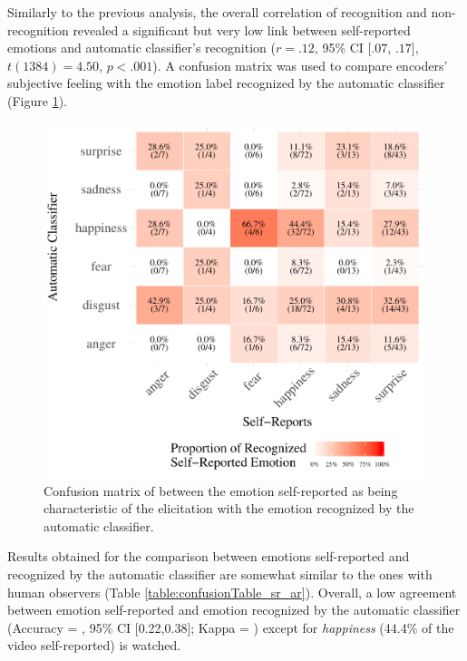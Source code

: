 \documentclass[conference,final,]{IEEEtran}
\makeatletter
\def\maxwidth{\ifdim\Gin@nat@width>\linewidth\linewidth
\else\Gin@nat@width\fi}
\let\Oldincludegraphics\includegraphics
\renewcommand{\includegraphics}[1]{\Oldincludegraphics[width=\maxwidth]{#1}}
\makeatother
\begin{document}
Similarly to the previous analysis, the overall correlation of
recognition and non-recognition revealed a significant but very low link
between self-reported emotions and automatic \nolinebreak classifier's
recognition (\(r = .12\), 95\% CI \([.07\), \(.17]\),
\(t(1384) = 4.50\), \(p < .001\)). A confusion matrix was used to
compare encoders' subjective feeling with the emotion label recognized
by the automatic classifier (Figure \ref{fig:confusionMatrix_sr_ar}).

\begin{figure}
\centering
\includegraphics{ACII_2019_paper_files/figure-latex/confusionMatrix_sr_ar-1.pdf}
\caption{\label{fig:confusionMatrix_sr_ar}Confusion matrix of between
the emotion self-reported as being characteristic of the elicitation
with the emotion recognized by the automatic classifier.}
\end{figure}

Results obtained for the comparison between emotions self-reported and
recognized by the automatic classifier are somewhat similar to the ones
with human observers (Table
\nolinebreak \ref{table:confusionTable_sr_ar}). Overall, a low agreement
between emotion self-reported and emotion recognized by the automatic
classifier (Accuracy \nolinebreak = , 95\% CI
{[}0.22,0.38{]}; Kappa \nolinebreak = ) except for
\emph{happiness} (44.4\% of the video self-reported) is watched.
\end{document}
